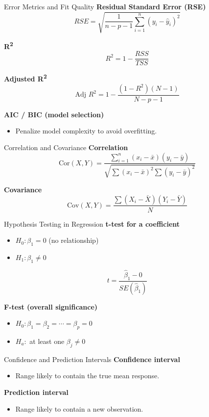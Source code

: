 \documentclass[aspectratio=169,10pt]{beamer}
\begin{document}
\begin{frame}[t]{Error Metrics and Fit Quality}
\textbf{Residual Standard Error (RSE)}
\[
RSE = \sqrt{\frac{1}{n-p-1} \sum_{i=1}^{n} (y_i-\hat{y}_i)^2}
\]

\textbf{R\textsuperscript{2}}
\[
R^2 = 1 - \frac{RSS}{TSS}
\]

\textbf{Adjusted R\textsuperscript{2}}
\[
\text{Adj } R^2 = 1 - \frac{(1-R^2)(N-1)}{N-p-1}
\]

\textbf{AIC / BIC (model selection)}
\begin{itemize}
\item Penalize model complexity to avoid overfitting.
\end{itemize}
\end{frame}

\begin{frame}[t]{Correlation and Covariance}
\textbf{Correlation}
\[
\text{Cor}(X,Y) = \frac{\sum_{i=1}^{n}(x_i-\bar{x})(y_i-\bar{y})}{\sqrt{\sum(x_i-\bar{x})^2 \sum(y_i-\bar{y})^2}}
\]

\textbf{Covariance}
\[
\text{Cov}(X,Y) = \frac{\sum (X_i-\bar{X})(Y_i-\bar{Y})}{N}
\]
\end{frame}

\begin{frame}[t]{Hypothesis Testing in Regression}
\textbf{t-test for a coefficient}
\begin{itemize}
\item $H_0: \beta_1 = 0$ (no relationship)
\item $H_1: \beta_1 \neq 0$
\end{itemize}
\[
 t = \frac{\hat{\beta}_1 - 0}{SE(\hat{\beta}_1)}
\]

\textbf{F-test (overall significance)}
\begin{itemize}
\item $H_0: \beta_1 = \beta_2 = \cdots = \beta_p = 0$
\item $H_a:$ at least one $\beta_j \neq 0$
\end{itemize}
\end{frame}

\begin{frame}[t]{Confidence and Prediction Intervals}
\textbf{Confidence interval}
\begin{itemize}
\item Range likely to contain the true mean response.
\end{itemize}

\textbf{Prediction interval}
\begin{itemize}
\item Range likely to contain a new observation.
\end{itemize}
\end{frame}
\end{document}
